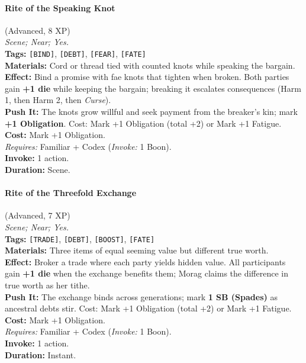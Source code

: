 \paragraph{Rite of the Speaking Knot} (Advanced, 8 XP) \hfill \\
\emph{Scene; Near; Yes.} \\
\textbf{Tags:} \texttt{[BIND]}, \texttt{[DEBT]}, \texttt{[FEAR]}, \texttt{[FATE]} \\
\textbf{Materials:} Cord or thread tied with counted knots while speaking the bargain. \\
\textbf{Effect:} Bind a promise with fae knots that tighten when broken. Both parties gain \textbf{+1 die} while keeping the bargain; breaking it escalates consequences (Harm 1, then Harm 2, then \textit{Curse}). \\
\textbf{Push It:} The knots grow willful and seek payment from the breaker's kin; mark \textbf{+1 Obligation}. Cost: Mark +1 Obligation (total +2) or Mark +1 Fatigue. \\
\textbf{Cost:} Mark +1 Obligation. \\
\textit{Requires:} Familiar + Codex (\textit{Invoke:} 1 Boon). \\
\textbf{Invoke:} 1 action. \\
\textbf{Duration:} Scene.

\paragraph{Rite of the Threefold Exchange} (Advanced, 7 XP) \hfill \\
\emph{Scene; Near; Yes.} \\
\textbf{Tags:} \texttt{[TRADE]}, \texttt{[DEBT]}, \texttt{[BOOST]}, \texttt{[FATE]} \\
\textbf{Materials:} Three items of equal seeming value but different true worth. \\
\textbf{Effect:} Broker a trade where each party yields hidden value. All participants gain \textbf{+1 die} when the exchange benefits them; Morag claims the difference in true worth as her tithe. \\
\textbf{Push It:} The exchange binds across generations; mark \textbf{1 SB (Spades)} as ancestral debts stir. Cost: Mark +1 Obligation (total +2) or Mark +1 Fatigue. \\
\textbf{Cost:} Mark +1 Obligation. \\
\textit{Requires:} Familiar + Codex (\textit{Invoke:} 1 Boon). \\
\textbf{Invoke:} 1 action. \\
\textbf{Duration:} Instant.

